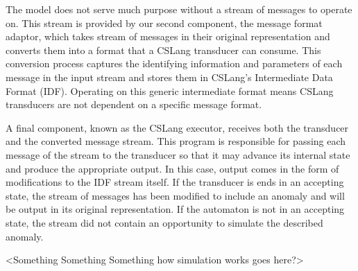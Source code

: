 The model does not serve much purpose without a stream of messages to
operate on.
This stream is provided by our second component,
the message format adaptor,
which takes
stream of messages in their original representation and converts
them into a format that a CSLang transducer can consume. This conversion process
captures the identifying information and parameters of each message in the
input stream and stores them in CSLang's Intermediate Data Format (IDF).
Operating on this generic intermediate format means CSLang transducers are
not dependent on a specific message format.


A final component, known as the CSLang executor,
receives both the transducer and the converted message stream.
This program is responsible for passing each message of the stream
to the transducer
so that it may advance its internal state and
produce the appropriate output.
In this case, output comes in the form of modifications to the IDF stream itself.
If the transducer is
ends in an accepting state, the stream of messages has
been modified to include an anomaly and will be output in its original
representation.  If the automaton is not in an accepting state, the stream
did not contain an opportunity to simulate the described anomaly.

<Something Something Something how simulation works goes here?>


